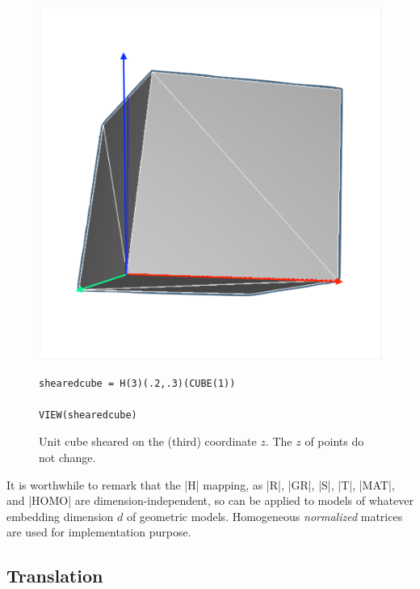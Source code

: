 \begin{coding}
\begin{figure}[htbp] %
\begin{minipage}[c]{0.35\textwidth}
   \includegraphics[width=\linewidth]{chapter-04/figs/shear3D} 
\end{minipage}\hfill
\begin{minipage}[c]{0.60\textwidth}
\begin{lstlisting}[language=JuliaLocal, style=julia, mathescape=true]
shearedcube = H(3)(.2,.3)(CUBE(1))

VIEW(shearedcube)
\end{lstlisting}
   \caption{Unit cube sheared on the (third) coordinate $z$. The $z$ of points do not change.}
\end{minipage}
\end{figure}

It is worthwhile to remark that the |H| mapping, as |R|, |GR|, |S|, |T|, |MAT|, and |HOMO| are dimension-independent, so can be applied to models of whatever embedding dimension $d$ of geometric models. Homogeneous \emph{normalized} matrices are used for implementation purpose. 


 
\subsection*{Translation}
\label{subsec:2:translation}


\end{coding}
